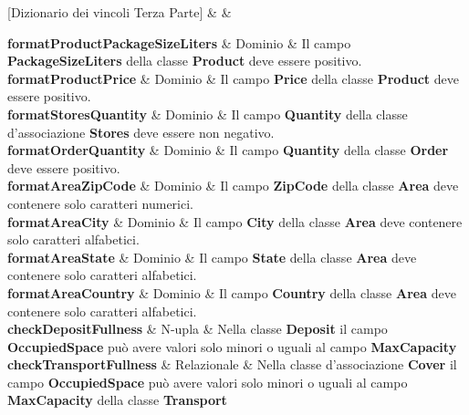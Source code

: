 [Dizionario dei vincoli Terza Parte]{ &  & }{
    
  \textbf{formatProductPackageSizeLiters} & Dominio & 
  {\footnotesize
  Il campo \textbf{PackageSizeLiters} della classe \textbf{Product} deve essere positivo.
  }\\ 

  \textbf{formatProductPrice} & Dominio & 
  {\footnotesize
  Il campo \textbf{Price} della classe \textbf{Product} deve essere positivo.
  }\\

  \textbf{formatStoresQuantity} & Dominio & 
  {\footnotesize
  Il campo \textbf{Quantity} della classe d'associazione \textbf{Stores} deve essere non negativo.
  }\\ 

  \textbf{formatOrderQuantity} & Dominio & 
  {\footnotesize
  Il campo \textbf{Quantity} della classe \textbf{Order} deve essere positivo.
  }\\

  \textbf{formatAreaZipCode} & Dominio & 
  {\footnotesize
  Il campo \textbf{ZipCode} della classe \textbf{Area} deve contenere solo caratteri numerici.
  }\\

  \textbf{formatAreaCity} & Dominio & 
  {\footnotesize
  Il campo \textbf{City} della classe \textbf{Area} deve contenere solo caratteri alfabetici.
  }\\
  
  \textbf{formatAreaState} & Dominio & 
  {\footnotesize
  Il campo \textbf{State} della classe \textbf{Area} deve contenere solo caratteri alfabetici.
  }\\
  
  \textbf{formatAreaCountry} & Dominio & 
  {\footnotesize
  Il campo \textbf{Country} della classe \textbf{Area} deve contenere solo caratteri alfabetici.
  }\\
  
  \textbf{checkDepositFullness} & N-upla & 
  {\footnotesize
  Nella classe \textbf{Deposit} il campo \textbf{OccupiedSpace} può avere valori solo minori o uguali al campo \textbf{MaxCapacity}
  }\\
  
  \textbf{checkTransportFullness} & Relazionale & 
  {\footnotesize
  Nella classe d'associazione \textbf{Cover} il campo \textbf{OccupiedSpace} può avere valori solo minori o uguali al campo \textbf{MaxCapacity} della classe \textbf{Transport}
  }\\
  
}
